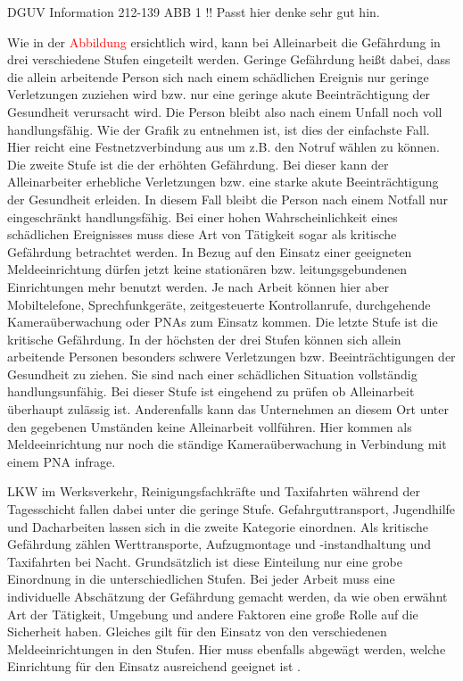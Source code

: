 \documentclass[thesis.tex]{subfiles}
\begin{document}
DGUV Information 212-139 ABB 1 !! Passt hier denke sehr gut hin.

Wie in der \textcolor{red}{Abbildung} ersichtlich wird, kann bei Alleinarbeit die Gefährdung in drei verschiedene Stufen eingeteilt werden.
Geringe Gefährdung heißt dabei, dass die allein arbeitende Person sich nach einem schädlichen Ereignis nur geringe Verletzungen zuziehen wird bzw. nur eine geringe akute Beeinträchtigung der Gesundheit verursacht wird.
Die Person bleibt also nach einem Unfall noch voll handlungsfähig.
Wie der Grafik zu entnehmen ist, ist dies der einfachste Fall.
Hier reicht eine Festnetzverbindung aus um z.B. den Notruf wählen zu können.
Die zweite Stufe ist die der erhöhten Gefährdung.
Bei dieser kann der Alleinarbeiter erhebliche Verletzungen bzw. eine starke akute Beeinträchtigung der Gesundheit erleiden.
In diesem Fall bleibt die Person nach einem Notfall nur eingeschränkt handlungsfähig.
Bei einer hohen Wahrscheinlichkeit eines schädlichen Ereignisses muss diese Art von Tätigkeit sogar als kritische Gefährdung betrachtet werden.
In Bezug auf den Einsatz einer geeigneten Meldeeinrichtung dürfen jetzt keine stationären bzw. leitungsgebundenen Einrichtungen mehr benutzt werden.
Je nach Arbeit können hier aber Mobiltelefone, Sprechfunkgeräte, zeitgesteuerte Kontrollanrufe, durchgehende Kameraüberwachung oder PNAs zum Einsatz kommen.
Die letzte Stufe ist die kritische Gefährdung.
In der höchsten der drei Stufen können sich allein arbeitende Personen besonders schwere Verletzungen bzw. Beeinträchtigungen der Gesundheit zu ziehen.
Sie sind nach einer schädlichen Situation vollständig handlungsunfähig.
Bei dieser Stufe ist eingehend zu prüfen ob Alleinarbeit überhaupt zulässig ist.
Anderenfalls kann das Unternehmen an diesem Ort unter den gegebenen Umständen keine Alleinarbeit vollführen.
Hier kommen als Meldeeinrichtung nur noch die ständige Kameraüberwachung in Verbindung mit einem PNA infrage.

LKW im Werksverkehr, Reinigungsfachkräfte und Taxifahrten während der Tagesschicht fallen dabei unter die geringe Stufe.
Gefahrguttransport, Jugendhilfe und Dacharbeiten lassen sich in die zweite Kategorie einordnen.
Als kritische Gefährdung zählen Werttransporte, Aufzugmontage und -instandhaltung und Taxifahrten bei Nacht.
Grundsätzlich ist diese Einteilung nur eine grobe Einordnung in die unterschiedlichen Stufen.
Bei jeder Arbeit muss eine individuelle Abschätzung der Gefährdung gemacht werden, da wie oben erwähnt Art der Tätigkeit, Umgebung und andere Faktoren eine große Rolle auf die Sicherheit haben.
Gleiches gilt für den Einsatz von den verschiedenen Meldeeinrichtungen in den Stufen.
Hier muss ebenfalls abgewägt werden, welche Einrichtung für den Einsatz ausreichend geeignet ist \cite[vgl. S.7-9]{Information_212-139}.
\end{document}
